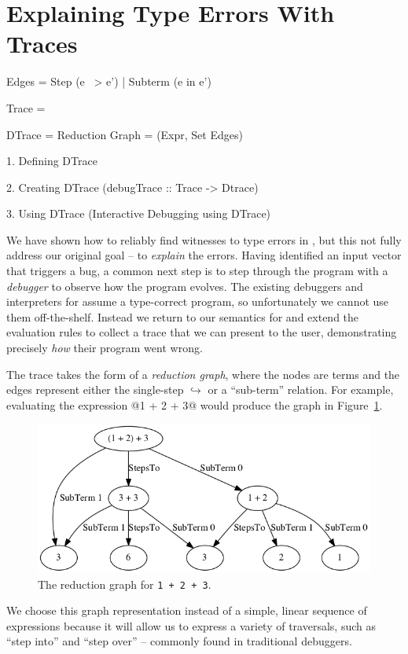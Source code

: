 \section{Explaining Type Errors With Traces}
\label{sec:explaining}

Edges  = Step (e ~> e')  | Subterm (e in e')

Trace  = 

DTrace = Reduction Graph = (Expr, Set Edges)

1. Defining DTrace

2. Creating DTrace (debugTrace :: Trace -> Dtrace)

3. Using DTrace (Interactive Debugging using DTrace)




We have shown how to reliably find witnesses to type errors in \ocaml,
but this not fully address our original goal -- to \emph{explain} the
errors.
%
Having identified an input vector that triggers a bug, a common next
step is to step through the program with a \emph{debugger} to observe
how the program evolves.
%
The existing debuggers and interpreters for \ocaml assume a type-correct
program, so unfortunately we cannot use them off-the-shelf.
%
Instead we return to our semantics for \lang and extend the evaluation
rules to collect a trace that we can present to the user, demonstrating
precisely \emph{how} their program went wrong.

The trace takes the form of a \emph{reduction graph}, where the nodes
are terms and the edges represent either the single-step
$\hookrightarrow$ or a ``sub-term'' relation. For example, evaluating
the expression @1 + 2 + 3@ would produce the graph in
Figure~\ref{fig:simple-reduction}.
%
\begin{figure}[t]
  \centering
  \includegraphics[width=\linewidth]{simple.png}
\caption{The reduction graph for \texttt{1 + 2 + 3}.}
\label{fig:simple-reduction}
\end{figure}
%
We choose this graph representation instead of a simple, linear sequence
of expressions because it will allow us to express a variety of
traversals, such as ``step into'' and ``step over'' -- commonly found in
traditional debuggers.

